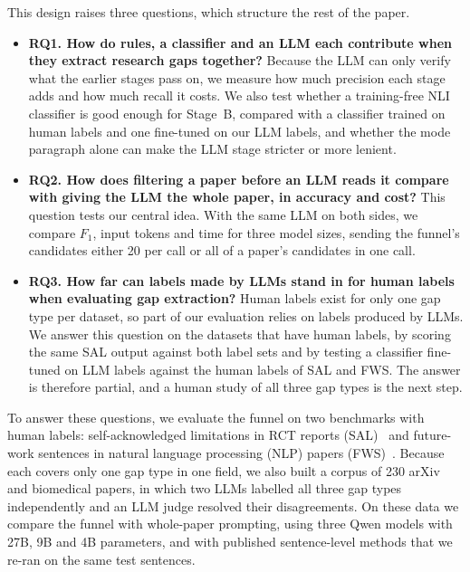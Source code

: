 This design raises three questions, which structure the rest of the paper.
\begin{itemize}
  \item \textbf{RQ1. How do rules, a classifier and an LLM each contribute when they extract research gaps together?} Because the LLM can only verify what the earlier stages pass on, we measure how much precision each stage adds and how much recall it costs. We also test whether a training-free NLI classifier is good enough for Stage~B, compared with a classifier trained on human labels and one fine-tuned on our LLM labels, and whether the mode paragraph alone can make the LLM stage stricter or more lenient.
  \item \textbf{RQ2. How does filtering a paper before an LLM reads it compare with giving the LLM the whole paper, in accuracy and cost?} This question tests our central idea. With the same LLM on both sides, we compare $F_1$, input tokens and time for three model sizes, sending the funnel's candidates either 20 per call or all of a paper's candidates in one call.
  \item \textbf{RQ3. How far can labels made by LLMs stand in for human labels when evaluating gap extraction?} Human labels exist for only one gap type per dataset, so part of our evaluation relies on labels produced by LLMs. We answer this question on the datasets that have human labels, by scoring the same SAL output against both label sets and by testing a classifier fine-tuned on LLM labels against the human labels of SAL and FWS. The answer is therefore partial, and a human study of all three gap types is the next step.
\end{itemize}

To answer these questions, we evaluate the funnel on two benchmarks with human labels: self-acknowledged limitations in RCT reports (SAL)~\cite{lan2024automatic} and future-work sentences in natural language processing (NLP) papers (FWS)~\cite{zhang2023fws}. Because each covers only one gap type in one field, we also built a corpus of 230 arXiv and biomedical papers, in which two LLMs labelled all three gap types independently and an LLM judge resolved their disagreements. On these data we compare the funnel with whole-paper prompting, using three Qwen models with 27B, 9B and 4B parameters, and with published sentence-level methods that we re-ran on the same test sentences.


